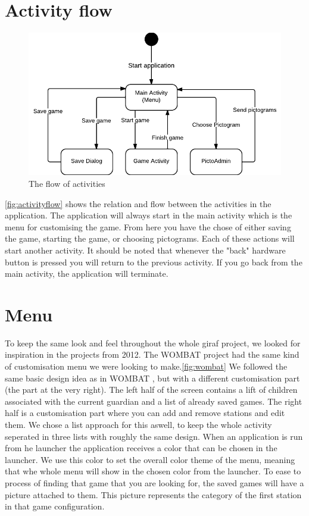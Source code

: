 \section{Activity flow}
\begin{figure}[H]
\centering
\includegraphics[width=0.9\linewidth]{img/activityflow.pdf}
\caption{The flow of activities}
\label{fig:activityflow}
\end{figure}
\autoref{fig:activityflow} shows the relation and flow between the activities in the application.
The application will always start in the main activity which is the menu for customising the game. From here you have the chose of either saving the game, starting the game, or choosing pictograms. Each of these actions will start another activity.
It should be noted that whenever the "back" hardware button is pressed you will return to the previous activity. If you go back from the main activity, the application will terminate.

\section{Menu}
To keep the same look and feel throughout the whole \ac{giraf} project, we looked for inspiration in the projects from 2012. The WOMBAT  project had the same kind of customisation menu we were looking to make.\autoref{fig:wombat} We followed the same basic design idea as in WOMBAT , but with a different customisation part (the part at the very right). The left half of the screen contains a lift of children associated with the current guardian and a list of already saved games. The right half is a customisation part where you can add and remove stations and edit them. We chose a list approach for this aswell, to keep the whole activity seperated in three lists with roughly the same design.
When an application is run from he launcher the application receives a color that can be chosen in the launcher. We use this color to set the overall color theme of the menu, meaning that whe whole menu will show in the chosen color from the launcher.
To ease to process of finding that game that you are looking for, the saved games will have a picture attached to them. This picture represents the category of the first station in that game configuration.

